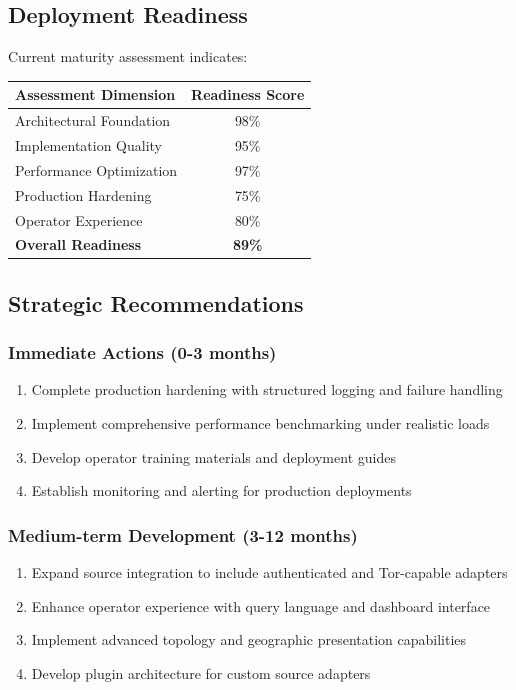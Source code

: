 \documentclass[12pt,a4paper]{article}
\begin{document}
\subsection{Deployment Readiness}

Current maturity assessment indicates:

\begin{center}
\begin{tabular}{|l|c|}
\hline
\textbf{Assessment Dimension} & \textbf{Readiness Score} \\
\hline
Architectural Foundation & 98\% \\
\hline
Implementation Quality & 95\% \\
\hline
Performance Optimization & 97\% \\
\hline
Production Hardening & 75\% \\
\hline
Operator Experience & 80\% \\
\hline
\textbf{Overall Readiness} & \textbf{89\%} \\
\hline
\end{tabular}
\end{center}

\subsection{Strategic Recommendations}

\subsubsection{Immediate Actions (0-3 months)}
\begin{enumerate}
\item Complete production hardening with structured logging and failure handling
\item Implement comprehensive performance benchmarking under realistic loads
\item Develop operator training materials and deployment guides
\item Establish monitoring and alerting for production deployments
\end{enumerate}

\subsubsection{Medium-term Development (3-12 months)}
\begin{enumerate}
\item Expand source integration to include authenticated and Tor-capable adapters
\item Enhance operator experience with query language and dashboard interface
\item Implement advanced topology and geographic presentation capabilities
\item Develop plugin architecture for custom source adapters
\end{enumerate}
\end{document}
